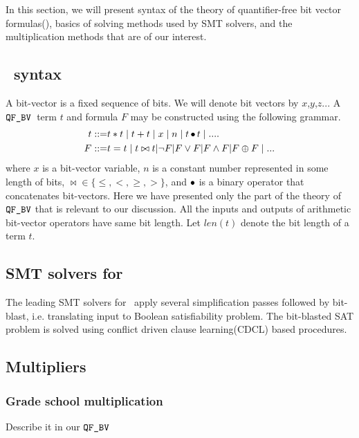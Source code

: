 In this section, we will present syntax of
the theory of quantifier-free bit vector formulas(\qfbv),
basics of solving methods used by SMT solvers,
and the multiplication methods that are of our interest. 

\subsection{\qfbv~syntax}

A bit-vector is a fixed sequence of bits.
%
We will denote bit vectors by $x$,$y$,$z$...
%
A $\texttt{QF\_BV}$~term $t$ and formula $F$ may be constructed using
the following grammar.
\begin{align*}
t ::= & t * t \mid t + t \mid x \mid n \mid t \mathop{\bullet} t \mid ....\\
F ::= & t = t \mid t \bowtie t | \lnot F | F \lor F | F \land F | F \oplus F \mid ... 
\end{align*}
where $x$ is a bit-vector variable, 
$n$ is a constant number represented in some length of bits,
$\bowtie \in \{\leq , <, \geq, > \}$, and
$\mathop{\bullet}$ is a binary operator that concatenates bit-vectors.
%
Here we have presented only the  part of the theory
of $\texttt{QF\_BV}$ that is relevant to our discussion.
%
All the inputs and outputs of arithmetic bit-vector operators 
have same bit length.
%
Let $len(t)$ denote the bit length of a term $t$.

\subsection{SMT solvers for \qfbv}

The leading SMT solvers for \qfbv~apply several simplification
passes followed by bit-blast, i.e. translating input to Boolean
satisfiability problem.
%
The bit-blasted SAT problem is solved using conflict driven clause
learning(CDCL) based procedures.
%




\subsection{Multipliers}



\subsubsection{Grade school multiplication}

Describe it in our $\texttt{QF\_BV}$


